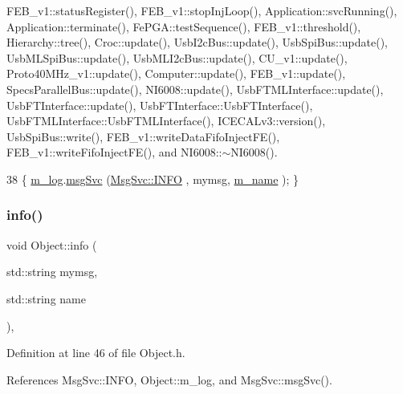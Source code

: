 F\+E\+B\+\_\+v1\+::status\+Register(), F\+E\+B\+\_\+v1\+::stop\+Inj\+Loop(), Application\+::svc\+Running(), Application\+::terminate(), Fe\+P\+G\+A\+::test\+Sequence(), F\+E\+B\+\_\+v1\+::threshold(), Hierarchy\+::tree(), Croc\+::update(), Usb\+I2c\+Bus\+::update(), Usb\+Spi\+Bus\+::update(), Usb\+M\+L\+Spi\+Bus\+::update(), Usb\+M\+L\+I2c\+Bus\+::update(), C\+U\+\_\+v1\+::update(), Proto40\+M\+Hz\+\_\+v1\+::update(), Computer\+::update(), F\+E\+B\+\_\+v1\+::update(), Specs\+Parallel\+Bus\+::update(), N\+I6008\+::update(), Usb\+F\+T\+M\+L\+Interface\+::update(), Usb\+F\+T\+Interface\+::update(), Usb\+F\+T\+Interface\+::\+Usb\+F\+T\+Interface(), Usb\+F\+T\+M\+L\+Interface\+::\+Usb\+F\+T\+M\+L\+Interface(), I\+C\+E\+C\+A\+Lv3\+::version(), Usb\+Spi\+Bus\+::write(), F\+E\+B\+\_\+v1\+::write\+Data\+Fifo\+Inject\+F\+E(), F\+E\+B\+\_\+v1\+::write\+Fifo\+Inject\+F\+E(), and N\+I6008\+::$\sim$\+N\+I6008().


\begin{DoxyCode}
38 \{ \hyperlink{classObject_a0d269813dd7ac1f24bc143031e2963f2}{m\_log}.\hyperlink{classMsgSvc_ad25f18047920cc59a314e5098259711c}{msgSvc} (\hyperlink{classMsgSvc_ae671eb7301996cd049d2da8a65925926ad2fcf3f3e734fc41ee097cc23670ce51}{MsgSvc::INFO}    , mymsg, \hyperlink{classObject_a8b83c95c705d2c3ba0d081fe1710f48d}{m\_name} ); \}
\end{DoxyCode}
\mbox{\label{classObject_a1ca123253dfd30fc28b156f521dcbdae}} 
\subsubsection{\texorpdfstring{info()}{info()}\hspace{0.1cm}{\footnotesize\ttfamily [2/2]}}
{\footnotesize\ttfamily void Object\+::info (\begin{DoxyParamCaption}\item[{std\+::string}]{mymsg,  }\item[{std\+::string}]{name }\end{DoxyParamCaption})\hspace{0.3cm}{\ttfamily [inline]}, {\ttfamily [inherited]}}



Definition at line 46 of file Object.\+h.



References Msg\+Svc\+::\+I\+N\+FO, Object\+::m\+\_\+log, and Msg\+Svc\+::msg\+Svc().


